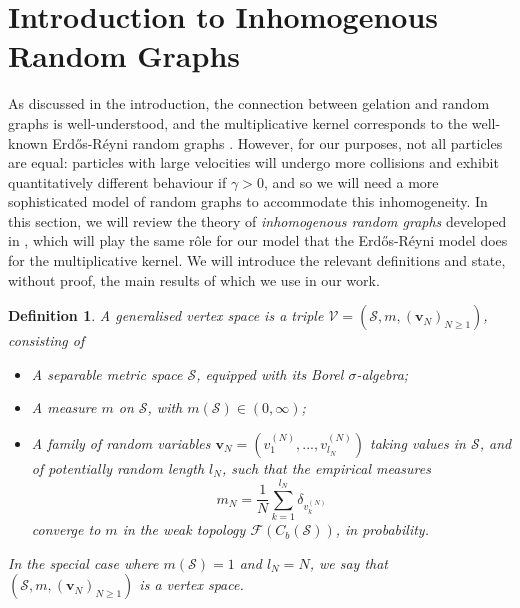 \documentclass[11pt, notitlepage]{article}
\newtheorem{defn}{Definition}[section]
\begin{document}
\section{\textbf{Introduction to Inhomogenous Random Graphs}}\label{sec: IRG}
As discussed in the introduction, the connection between gelation and random graphs is well-understood, and the multiplicative kernel corresponds to the well-known Erd\H{o}s-R\'eyni random graphs \cite{Flo41,ER60,A99}. However, for our purposes, not all particles are equal: particles with large velocities will undergo more collisions and exhibit quantitatively different behaviour if $\gamma>0$, and so we will need a more sophisticated model of random graphs to accommodate this inhomogeneity. In this section, we will review the theory of \emph{inhomogenous random graphs} developed in \cite{BJR07}, which will play the same r\^ole for our model that the Erd\H{o}s-R\'eyni model does for the multiplicative kernel. We will introduce the relevant definitions and state, without proof, the main results of \cite{BJR07} which we use in our work.
\begin{defn} \label{def: Generalised vertex space} A \emph{generalised vertex space} is a triple $\mathcal{V}=(\mathcal{S}, m, (\mathbf{v}_N)_{N\geq 1})$, consisting of \begin{itemize}
    \item A separable metric space $\mathcal{S}$, equipped with its Borel $\sigma$-algebra;
    \item A measure $m$ on $\mathcal{S}$, with $m(\mathcal{S}) \in (0, \infty)$; 
    \item A family of random variables $\mathbf{v}_N=(v^{(N)}_1,...,v^{(N)}_{l_N})$ taking values in $\mathcal{S}$, and of potentially random length $l_N$,  such that the empirical measures \begin{equation}
        m_N=\frac{1}{N}\sum_{k=1}^{l_N} \delta_{v^{(N)}_k} \end{equation} converge to $m$ in the weak topology $\mathcal{F}(C_b(\mathcal{S}))$, in probability.

\end{itemize} In the special case where $m(\mathcal{S})=1$ and $l_N=N$, we say that $(\mathcal{S}, m, (\mathbf{v}_N)_{N\geq 1})$ is a \emph{vertex space}. \end{defn}  
\end{document}
